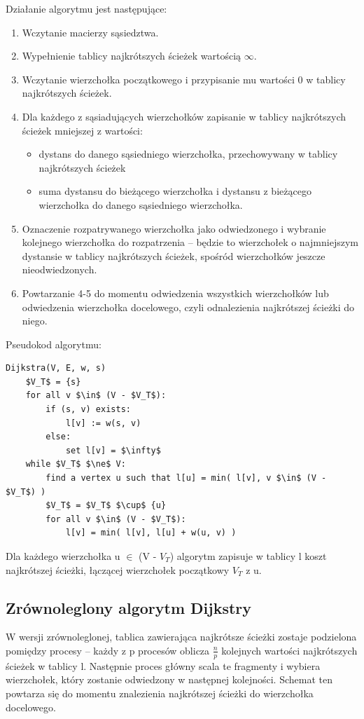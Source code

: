 \documentclass{article}
\begin{document}
Działanie algorytmu jest następujące: 
\begin{enumerate}
	\item Wczytanie macierzy sąsiedztwa.
	\item Wypełnienie tablicy najkrótszych ścieżek wartością $\infty$.
	\item Wczytanie wierzchołka początkowego i przypisanie mu wartości 0 w tablicy najkrótszych ścieżek.
	\item Dla każdego z sąsiadujących wierzchołków zapisanie w tablicy najkrótszych ścieżek mniejszej z wartości:
	\begin{itemize}
		\item dystans do danego sąsiedniego wierzchołka, przechowywany w tablicy najkrótszych ścieżek
		\item suma dystansu do bieżącego wierzchołka i dystansu z bieżącego wierzchołka do danego sąsiedniego wierzchołka.
	\end{itemize}
	\item Oznaczenie rozpatrywanego wierzchołka jako odwiedzonego i wybranie kolejnego wierzchołka do rozpatrzenia -- będzie to wierzchołek o najmniejszym dystansie w tablicy najkrótszych ścieżek, spośród wierzchołków jeszcze nieodwiedzonych.
	\item Powtarzanie 4-5 do momentu odwiedzenia wszystkich wierzchołków lub odwiedzenia wierzchołka docelowego, czyli odnalezienia najkrótszej ścieżki do niego.
\end{enumerate}

Pseudokod algorytmu:

\begin{lstlisting}[mathescape]
Dijkstra(V, E, w, s)
	$V_T$ = {s}
	for all v $\in$ (V - $V_T$):
		if (s, v) exists:
			l[v] := w(s, v)
		else:
			set l[v] = $\infty$
	while $V_T$ $\ne$ V:
		find a vertex u such that l[u] = min( l[v], v $\in$ (V - $V_T$) )
		$V_T$ = $V_T$ $\cup$ {u}
		for all v $\in$ (V - $V_T$):
			l[v] = min( l[v], l[u] + w(u, v) )
\end{lstlisting}

Dla każdego wierzchołka u $\in$ (V - $V_T$) algorytm zapisuje w tablicy l koszt najkrótszej ścieżki, łączącej wierzchołek początkowy $V_T$ z u.

\subsection{Zrównoleglony algorytm Dijkstry}

W wersji zrównoleglonej, tablica zawierająca najkrótsze ścieżki zostaje podzielona pomiędzy procesy -- każdy z p procesów oblicza $\frac{n}{p}$ kolejnych wartości najkrótszych ścieżek w tablicy l. Następnie proces główny scala te fragmenty i wybiera wierzchołek, który zostanie odwiedzony w następnej kolejności. Schemat ten powtarza się do momentu znalezienia najkrótszej ścieżki do wierzchołka docelowego.
\end{document}
